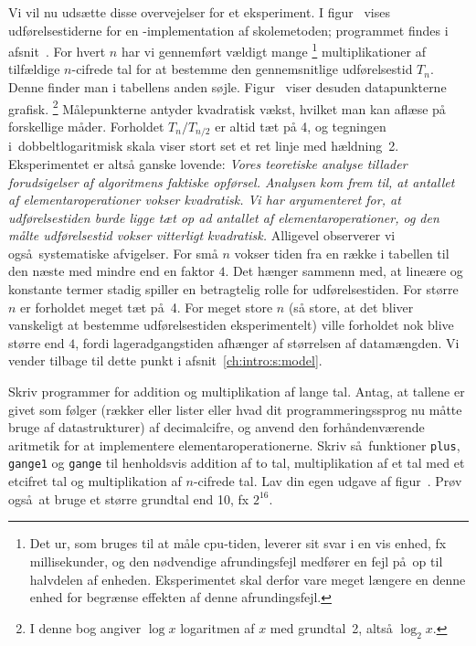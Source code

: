 Vi vil nu udsætte disse overvejelser for et eksperiment.
I figur~ vises udførelsestiderne for en \CC-implementation af skolemetoden;
programmet findes i afsnit~.
For hvert $n$ har vi gennemført vældigt mange
\footnote{Det ur, som bruges til at måle cpu-tiden, leverer sit svar i en vis enhed, fx millisekunder, og den nødvendige afrundingsfejl medfører en fejl på op til halvdelen af enheden. 
Eksperimentet skal derfor vare meget længere en denne enhed for begrænse effekten  af denne afrundingsfejl.}
multiplikationer af tilfældige $n$-cifrede tal for at bestemme den gennemsnitlige udførelsestid $T_n$.
Denne finder man i tabellens anden søjle.
Figur~ viser desuden datapunkterne grafisk.%
\footnote{I denne bog angiver $\log x$ logaritmen af $x$ med grundtal~2, altså $\log_2 x$.}
Målepunkterne antyder kvadratisk vækst, hvilket man kan aflæse på forskellige måder.
Forholdet $T_n/T_{n/2}$ er altid tæt på 4, og tegningen i dobbeltlogaritmisk skala viser stort set et ret linje med hældning~2.
Eksperimentet er altså ganske lovende:
\emph{Vores teoretiske analyse tillader forudsigelser af algoritmens faktiske opførsel.
Analysen kom frem til, at antallet af elementaroperationer vokser kvadratisk. 
Vi har argumenteret for, at udførelsestiden burde ligge tæt op ad antallet af elementaroperationer, og den målte udførelsestid vokser vitterligt kvadratisk.} 
Alligevel observerer vi også systematiske afvigelser.
For små $n$ vokser tiden fra en række i tabellen til den næste med mindre end en faktor $4$.
Det hænger sammenn med, at lineære og konstante termer stadig spiller en betragtelig rolle for udførelsestiden.
For større $n$ er forholdet meget tæt på 4.
For meget store $n$ (så store, at det bliver vanskeligt at bestemme udførelsestiden eksperimentelt) ville forholdet nok blive større end $4$, fordi lageradgangstiden afhænger af størrelsen af datamængden.
Vi vender tilbage til dette punkt i afsnit~\ref{ch:intro:s:model}.

\begin{exerc} 
  Skriv programmer for addition og multiplikation af lange tal.
  Antag, at tallene er givet som følger (rækker eller lister eller hvad dit programmeringssprog nu måtte bruge af datastrukturer) af decimalcifre, og anvend den forhåndenværende aritmetik for at implementere elementaroperationerne.
  Skriv så funktioner \texttt{plus}, \texttt{gange1} og \texttt{gange} til henholdsvis addition af to tal, multiplikation af et tal med et etcifret tal og multiplikation af $n$-cifrede tal.
  Lav din egen udgave af figur~.
  Prøv også at bruge et større grundtal end 10, fx $2^{16}$.  
\end{exerc}


